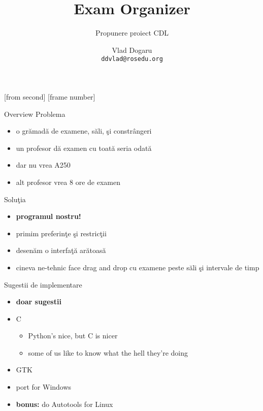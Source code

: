 \documentclass{beamer}
\title{Exam Organizer}
\subtitle{Propunere proiect CDL}
\institute{ROSEdu}
\author{Vlad Dogaru \\ \texttt{ddvlad@rosedu.org}}
\begin{document}
[from second]
[frame number]

\frame{\titlepage}

\begin{frame}{Overview}
Problema
\begin{itemize}
  \pause
  \item o grămadă de examene, săli, şi constrângeri
  \pause
  \item un profesor dă examen cu toată seria odată
  \pause
  \item dar nu vrea A250
  \pause
  \item alt profesor vrea 8 ore de examen
\end{itemize}
\pause

Soluţia
\begin{itemize}
  \pause
  \item \textbf{programul nostru!}
  \pause
  \item primim preferinţe şi restricţii
  \pause
  \item desenăm o interfaţă arătoasă
  \pause
  \item cineva ne-tehnic face drag and drop cu examene peste săli şi intervale
  de timp
\end{itemize}
\end{frame}

\begin{frame}{Sugestii de implementare}
\begin{itemize}
  \pause
  \item \textbf{doar sugestii}
  \pause
  \item C
    \begin{itemize}
    \pause
    \item Python's nice, but C is nicer
    \pause
    \item some of us like to know what the hell they're doing
    \end{itemize}
  \pause
  \item GTK
  \pause
  \item port for Windows
  \pause
  \item \textbf{bonus:} do Autotools for Linux
\end{itemize}
\end{frame}
\end{document}

